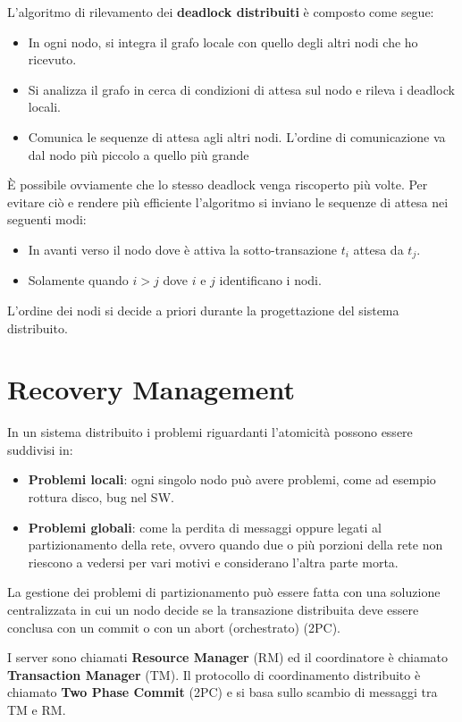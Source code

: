 L'algoritmo di rilevamento dei \textbf{deadlock distribuiti} è composto come segue:
\begin{itemize}
      \item In ogni nodo, si integra il grafo locale con quello degli altri nodi
            che ho ricevuto.
      \item Si analizza il grafo in cerca di condizioni di attesa sul nodo e
            rileva i deadlock locali.
      \item Comunica le sequenze di attesa agli altri nodi. L'ordine di
            comunicazione va dal nodo più piccolo a quello più grande
\end{itemize}

È possibile ovviamente che lo stesso deadlock venga riscoperto più volte. Per
evitare ciò e rendere più efficiente l'algoritmo si inviano le sequenze di attesa
nei seguenti modi:
\begin{itemize}
      \item In avanti verso il nodo dove è attiva la sotto-transazione $t_i$
            attesa da $t_j$.
      \item Solamente quando $i > j$ dove $i$ e $j$ identificano i nodi.
\end{itemize}

L'ordine dei nodi si decide a priori durante la progettazione del sistema distribuito.

\section{Recovery Management}
In un sistema distribuito i problemi riguardanti l'atomicità possono essere
suddivisi in:
\begin{itemize}
      \item \textbf{Problemi locali}: ogni singolo nodo può avere problemi, come ad
            esempio rottura disco, bug nel SW.
      \item \textbf{Problemi globali}: come la perdita di messaggi oppure legati al
            partizionamento della rete, ovvero quando due o più porzioni della
            rete non riescono a vedersi per vari motivi e considerano l'altra
            parte morta.
\end{itemize}
La gestione dei problemi di partizionamento può essere fatta con una soluzione
centralizzata in cui un nodo decide se la transazione distribuita deve essere
conclusa con un commit o con un abort (orchestrato) (2PC).

I server sono chiamati \textbf{Resource Manager} (RM) ed il coordinatore è
chiamato \textbf{Transaction Manager} (TM). Il protocollo di coordinamento
distribuito è chiamato \textbf{Two Phase Commit} (2PC) e si basa sullo scambio
di messaggi tra TM e RM.


